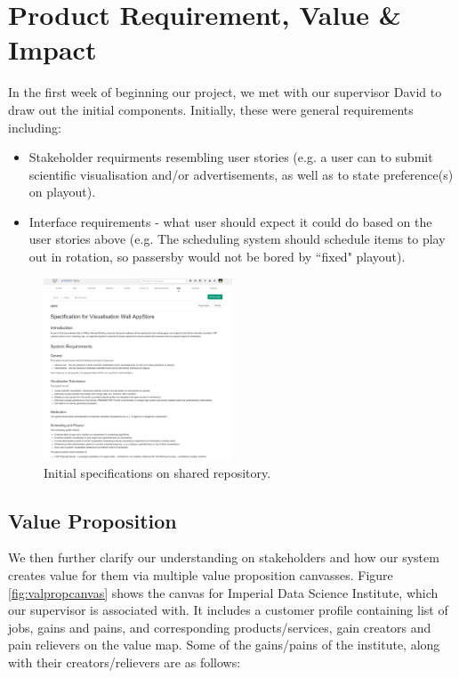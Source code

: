 \documentclass[a4paper]{article}
\begin{document}
\section{Product Requirement, Value \& Impact}
In the first week of beginning our project, we met with our supervisor 
David to draw out the initial components. Initially, these were general
requirements including:

\begin{itemize}
  \item Stakeholder requirments resembling user stories (e.g.
        a user can to submit scientific visualisation and/or advertisements, 
        as well as to state preference(s) on playout).
  \item Interface requirements - what user should expect it could do
        based on the user stories above (e.g. The scheduling system should
        schedule items to play out in rotation, so passersby would not be
        bored by ``fixed" playout).

\end{itemize}

\begin{figure}[H]
  \centering
    \includegraphics[width = 0.5\textwidth]{./evaluation/specs.png}

  \caption{Initial specifications on shared repository.}
  \label{fig:specs}
\end{figure}

\subsection{Value Proposition}
We then further clarify our understanding on stakeholders and how our system
creates value for them via multiple value proposition canvasses. Figure
\ref{fig:valpropcanvas} shows the canvas for Imperial Data Science Institute,
which our supervisor is associated with. It includes a customer profile
containing list of jobs, gains and pains, and corresponding products/services,
gain creators and pain relievers on the value map. Some of the gains/pains
of the institute, along with their creators/relievers are as follows:
\end{document}

